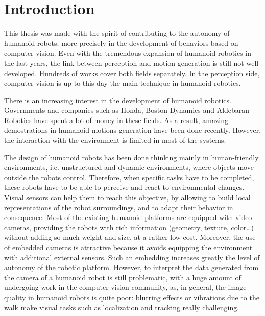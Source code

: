 
\chapter{Introduction} 
\label{Chap:Introduction}

This thesis was made with the spirit of contributing to the autonomy of humanoid robots; more precisely in the development of behaviors based on computer vision. Even with the tremendous expansion of humanoid robotics in the last years, the link between perception and motion generation is still not well developed. Hundreds of works cover both fields separately. In the perception side, computer vision is up to this day the main technique in humanoid robotics. 

There is an increasing interest in the development of humanoid robotics. Governments and companies such as Honda, Boston Dynamics and Aldebaran Robotics have spent a lot of money in these fields. As a result, amazing demostrations in humanoid motions generation have been done recently. However, the interaction with the environment is limited in most of the systems.

The design of humanoid robots has been done thinking mainly in human-friendly environments, i.e. unstructured and dynamic environments, where objects move outside the robots control. Therefore, when specific tasks have to be completed, these robots have to be able to perceive and react to environmental changes. Visual sensors can help them to reach this objective, by allowing to build local representations of the robot surroundings, and to adapt their behavior in consequence. Most of the existing humanoid platforms are equipped with video cameras, providing the robots with rich information (geometry, texture, color\dots) without adding so much weight and size, at a rather low cost. Moreover, the use of embedded cameras is attractive because it avoids equipping the environment with additional external sensors. Such an embedding increases greatly the level of autonomy of the robotic platform. However, to interpret the data generated from the camera of a humanoid robot is still problematic, with a huge amount of undergoing work in the computer vision community, as, in general, the image quality in humanoid robots is quite poor: blurring effects or vibrations due to the walk make visual tasks such as  localization and tracking really challenging. 


